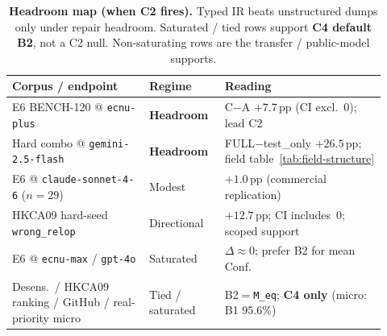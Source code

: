 \begin{table}[t]
  \centering
  \caption{\textbf{Headroom map (when C2 fires).}
    Typed IR beats unstructured dumps only under repair headroom.
    Saturated / tied rows support \textbf{C4 default B2}, not a C2 null.
    Non-saturating rows are the transfer / public-model supports.}
  \label{tab:headroom-map}
  \footnotesize
  \renewcommand{\arraystretch}{1.12}
  \begin{tabular}{@{}p{0.34\linewidth}p{0.18\linewidth}p{0.40\linewidth}@{}}
    \toprule
    \textbf{Corpus / endpoint} & \textbf{Regime} & \textbf{Reading} \\
    \midrule
    E6 BENCH-120 @ \texttt{ecnu-plus}
      & \textbf{Headroom}
      & C$-$A ${+}7.7$\,pp (CI excl.~0); lead C2 \\
    Hard combo @ \texttt{gemini-2.5-flash}
      & \textbf{Headroom}
      & FULL$-$test\_only ${+}26.5$\,pp; field table~\ref{tab:field-structure} \\
    E6 @ \texttt{claude-sonnet-4-6} ($n{=}29$)
      & Modest
      & ${+}1.0$\,pp (commercial replication) \\
    HKCA09 hard-seed \texttt{wrong\_relop}
      & Directional
      & ${+}12.7$\,pp; CI includes~0; scoped support \\
    E6 @ \texttt{ecnu-max} / \texttt{gpt-4o}
      & Saturated
      & $\Delta{\approx}0$; prefer B2 for mean Conf. \\
    Desens.\ / HKCA09 ranking / GitHub / real-priority micro
      & Tied / saturated
      & B2${=}$\texttt{M\_eq}; \textbf{C4 only} (micro: B1 95.6\%) \\
    \bottomrule
  \end{tabular}
\end{table}
